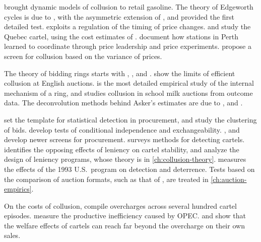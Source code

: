 \citet{BorensteinShepard1996} brought dynamic models of collusion to retail gasoline. The theory of Edgeworth cycles
is due to \citet{MaskinTirole1988}, with the asymmetric extension of \citet{Eckert2003}, and \citet{Noel2007}
provided the first detailed test. \citet{Wang2009} exploits a regulation of the timing of price changes.
\citet{ClarkHoude2013,ClarkHoude2014} and \citet{ErutkuHildebrand2010} study the Quebec cartel, using the cost
estimates of \citet{Houde2012}. \citet{ByrneDeRoos2019} document how stations in Perth learned to coordinate
through price leadership and price experiments. \citet{AbrantesMetzEtAl2006} propose a screen for collusion based on the variance of
prices.

The theory of bidding rings starts with \citet{GrahamMarshall1987}, \citet{GrahamMarshallRichard1990},
\citet{MailathZemsky1991} and \citet{McAfeeMcMillan1992}. \citet{LopomoMarshallMarx2005} show the limits of
efficient collusion at English auctions. \citet{Asker2010} is the most detailed empirical study of the internal
mechanism of a ring, and \citet{Pesendorfer2000} studies collusion in school milk auctions from outcome data. The
deconvolution methods behind Asker's estimates are due to \citet{Kotlarski1966}, \citet{LiVuong1998} and
\citet{Krasnokutskaya2011}.

\citet{PorterZona1993,PorterZona1999} set the template for statistical detection in procurement, and
\citet{FeinsteinBlockNold1985} study the clustering of bids. \citet{BajariYe2003} develop tests of conditional
independence and exchangeability. \citet{KawaiNakabayashi2020}, \citet{ConleyDecarolis2016} and
\citet{OrtnerEtAl2020} develop newer screens for procurement. \citet{Harrington2008b} surveys methods for detecting
cartels. \citet{Harrington2008} identifies the opposing effects of leniency on cartel stability, and
\citet{ChenRey2013} analyze the design of leniency programs, whose theory is in \cref{ch:collusion-theory}.
\citet{Miller2009} measures the effects of the 1993 U.S.\ program on detection and deterrence. Tests based on the
comparison of auction formats, such as that of \citet{AtheyLevinSeira2011}, are treated in
\cref{ch:auction-empirics}.

On the costs of collusion, \citet{ConnorBolotova2006} compile overcharges across several hundred cartel episodes.
\citet{AskerCollardWexlerDeLoecker2019} measure the productive inefficiency caused by OPEC.
\citet{Barkley2020} and \citet{Caoui2020} show that the welfare effects of cartels can reach far beyond the
overcharge on their own sales.

